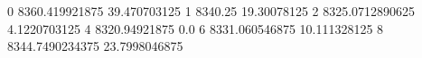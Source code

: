 0 8360.419921875 39.470703125
1 8340.25 19.30078125
2 8325.0712890625 4.1220703125
4 8320.94921875 0.0
6 8331.060546875 10.111328125
8 8344.7490234375 23.7998046875
